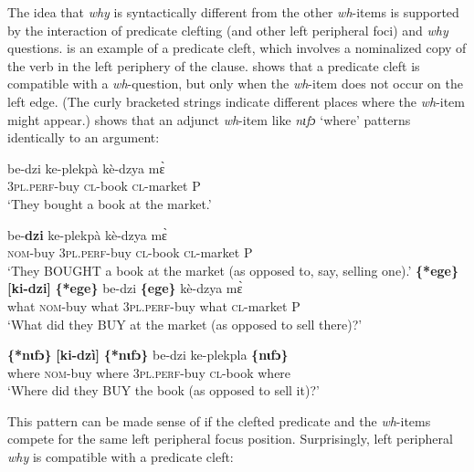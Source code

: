 \documentclass[output=paper]{langscibook}
\begin{document}
The idea that \textit{why} is syntactically different from the other \textit{wh}-items is supported by the interaction of predicate clefting (and other left peripheral foci) and \textit{why} questions.  is an example of a predicate cleft, which involves a nominalized copy of the verb in the left periphery of the clause.  shows that a predicate cleft is compatible with a \textit{wh}-question, but only when the \textit{wh}-item does not occur on the left edge. (The curly bracketed strings indicate different places where the \textit{wh}-item might appear.)  shows that an adjunct \textit{wh}-item like \textit{nɩfɔ} `where’ patterns identically to an argument:
\ea \label{ex:devlin:pred-cleft}
\begin{xlist}
\ex 
\gll be-dzi ke-plekp\`{a} k\`{e}-dzya m\`{ɛ}\\
\textsc{3pl.perf}-buy \textsc{cl}-book \textsc{cl}-market P\\
\glt `They bought a book at the market.’ 

\ex \label{ex:devlin:pred-cleft-basic}
\gll [\textbf{ki-dz\'{i}}] be-\textbf{dzi} ke-plekp\`{a} k\`{e}-dzya m\`{ɛ}\\
\textsc{nom}-buy \textsc{3pl.perf}-buy \textsc{cl}-book	 \textsc{cl}-market P\\
\glt `They BOUGHT a book at the market (as opposed to, say, selling one).’ \hfill %
\ex \label{ex:devlin:pred-cleft-what} %
\gll \textbf{\{*ege\}} \textbf{[ki-dzi]} \textbf{\{*ege\}} be-dzi \textbf{\{ege\}} k\`{e}-dzya m\`{ɛ}\\
what \textsc{nom}-buy what \textsc{3pl.perf}-buy what \textsc{cl}-market P\\
\glt `What did they BUY  at the market (as opposed to sell there)?’

\ex \label{ex:devlin:pred-cleft-where}%
\gll \textbf{\{*nɩfɔ\}} \textbf{[ki-dz\`{i}]} \textbf{\{*nɩfɔ\}} be-dzi ke-plekpla \textbf{\{nɩfɔ\}} \\
where \textsc{nom}-buy where \textsc{3pl.perf}-buy \textsc{cl}-book where \\
\glt `Where did they BUY the book (as opposed to sell it)?’
\end{xlist}
\z


This pattern can be made sense of if the clefted predicate and the \textit{wh}-items compete for the same left peripheral focus position. Surprisingly, left peripheral \textit{why} is compatible with a predicate cleft: 
\end{document}
